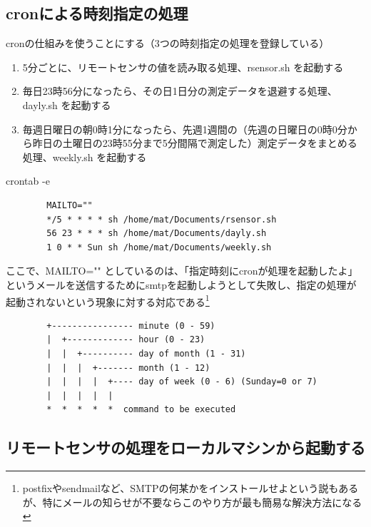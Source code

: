 \documentclass[12pt,a4paper,uplatex]{jsarticle}
\begin{document}

\subsection{cronによる時刻指定の処理}

cronの仕組みを使うことにする（3つの時刻指定の処理を登録している）
\begin{enumerate}
	\item[(1)] 5分ごとに、リモートセンサの値を読み取る処理、rsensor.sh を起動する
	\item[(2)] 毎日23時56分になったら、その日1日分の測定データを退避する処理、dayly.sh を起動する
	\item[(3)] 毎週日曜日の朝0時1分になったら、先週1週間の（先週の日曜日の0時0分から昨日の土曜日の23時55分まで5分間隔で測定した）測定データをまとめる処理、weekly.sh を起動する
\end{enumerate}

\begin{itembox}[l]{crontab -e}
	\begin{verbatim}
		MAILTO=""
		*/5 * * * * sh /home/mat/Documents/rsensor.sh
		56 23 * * * sh /home/mat/Documents/dayly.sh
		1 0 * * Sun sh /home/mat/Documents/weekly.sh
	\end{verbatim}
\end{itembox}

ここで、MAILTO="" としているのは、「指定時刻にcronが処理を起動したよ」というメールを送信するためにsmtpを起動しようとして失敗し、指定の処理が起動されないという現象に対する対応である\footnote{postfixやsendmailなど、SMTPの何某かをインストールせよという説もあるが、特にメールの知らせが不要ならこのやり方が最も簡易な解決方法になる}

\begin{screen}
	\begin{verbatim}
		+---------------- minute (0 - 59)
		|  +------------- hour (0 - 23)
		|  |  +---------- day of month (1 - 31)
		|  |  |  +------- month (1 - 12)
		|  |  |  |  +---- day of week (0 - 6) (Sunday=0 or 7)
		|  |  |  |  |
		*  *  *  *  *  command to be executed
	\end{verbatim}
\end{screen}

\newpage

\subsection{リモートセンサの処理をローカルマシンから起動する}
\end{document}
